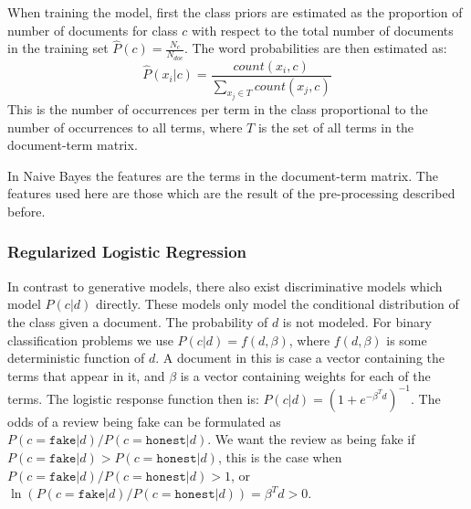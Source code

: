 \documentclass[a4paper,11pt]{article}
\begin{document}
When training the model, first the class priors are estimated as the proportion of number of documents for class $c$ with respect to the total number of documents in the training set $\hat{P}(c) = \frac{N_c}{N_{doc}}$. The word probabilities are then estimated as: \[\hat{P}(x_i|c) = \frac{count(x_i, c)}{\sum_{x_j\in T} count(x_j, c)}\] This is the number of occurrences per term in the class proportional to the number of occurrences to all terms, where $T$ is the set of all terms in the document-term matrix.

In Naive Bayes the features are the terms in the document-term matrix. The features used here are those which are the result of the pre-processing described before. 

\subsubsection{Regularized Logistic Regression}
\label{section:logitRegressionExplained}
In contrast to generative models, there also exist discriminative models which model $P(c|d)$ directly. These models only model the conditional distribution of the class given a document. The probability of $d$ is not modeled. For binary classification problems we use $P(c|d) = f(d,\beta)$, where $f(d,\beta)$ is some deterministic function of $d$. A document in this is case a vector containing the terms that appear in it, and $\beta$ is a vector containing weights for each of the terms. The logistic response function then is: $P(c|d) = (1+e^{-\beta^Td})^{-1}$. The odds of a review being fake can be formulated as $P(c = \texttt{fake} | d) / P(c = \texttt{honest} | d)$. We want the review as being fake if $P(c = \texttt{fake} | d) > P(c = \texttt{honest} | d)$, this is the case when $P(c = \texttt{fake} | d) / P(c = \texttt{honest} | d) > 1$, or $\ln (P(c = \texttt{fake} | d) / P(c = \texttt{honest} | d)) = \beta^Td > 0$. 
\end{document}
